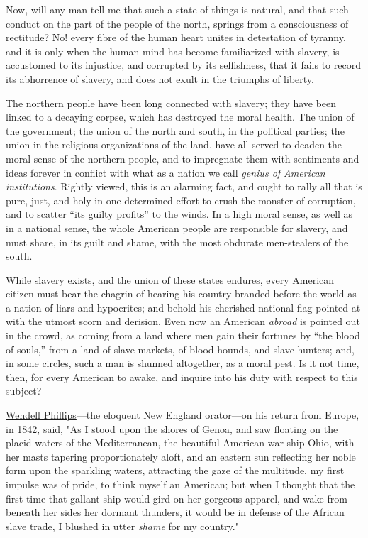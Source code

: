 Now, will any man tell me that such a state of things is natural, and
that such conduct on the part of the people of the north, springs from a
consciousness of rectitude? No! every fibre of the human heart unites in
detestation of tyranny, and it is only when the human mind has become
familiarized with slavery, is accustomed to its injustice, and corrupted
by its selfishness, that it fails to record its abhorrence of slavery,
and does not exult in the triumphs of liberty.

{}The northern people have been long connected with slavery; they have
been linked to a decaying corpse, which has destroyed the moral health.
The union of the government; the union of the north and south, in the
political parties; the union in the religious organizations of the land,
have all served to deaden the moral sense of the northern people, and to
impregnate them with sentiments and ideas forever in conflict with what
as a nation we call \emph{genius of American institutions}. Rightly
viewed, this is an alarming fact, and ought to rally all that is pure,
just, and holy in one determined effort to crush the monster of
corruption, and to scatter ``its guilty profits'' to the winds. In a
high moral sense, as well as in a national sense, the whole American
people are responsible for slavery, and must share, in its guilt and
shame, with the most obdurate men-stealers of the south.

While slavery exists, and the union of these states endures, every
American citizen must bear the chagrin of hearing his country branded
before the world as a nation of liars and hypocrites; and behold his
cherished national flag pointed at with the utmost scorn and derision.
Even now an American \emph{abroad} is pointed out in the crowd, as
coming from a land where men gain their fortunes by ``the blood of
souls,'' from a land of slave markets, of blood-hounds, and
slave-hunters; and, in some circles, such a man is shunned altogether,
as a moral pest. Is it not time, then, for every American to awake, and
inquire into his duty with respect to this subject?

{\href{/wiki/Author:Wendell_Phillips}{Wendell Phillips}}---the eloquent
New England orator---on his return from Europe, in 1842, said, "As I
stood upon the shores of Genoa, and saw floating on the placid waters of
the Mediterranean, the beautiful American war ship Ohio, with her masts
tapering proportionately aloft, and an eastern sun reflecting her noble
form upon the sparkling waters, attracting the gaze of the multitude, my
first impulse was of pride, to think myself an American; but when I
thought that the first time that gallant ship would gird on her gorgeous
apparel, and wake from beneath her sides her dormant thunders, it would
be in defense of the African slave trade, I blushed in utter
\emph{shame} for my country."

